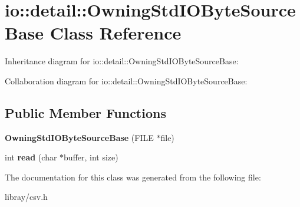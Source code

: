\hypertarget{classio_1_1detail_1_1OwningStdIOByteSourceBase}{}\section{io\+:\+:detail\+:\+:Owning\+Std\+I\+O\+Byte\+Source\+Base Class Reference}
\label{classio_1_1detail_1_1OwningStdIOByteSourceBase}


Inheritance diagram for io\+:\+:detail\+:\+:Owning\+Std\+I\+O\+Byte\+Source\+Base\+:


Collaboration diagram for io\+:\+:detail\+:\+:Owning\+Std\+I\+O\+Byte\+Source\+Base\+:
\subsection*{Public Member Functions}
\begin{DoxyCompactItemize}
\item 
\mbox{\label{classio_1_1detail_1_1OwningStdIOByteSourceBase_a259f77d1a3c57720b54b88d9f8a3c018}} 
{\bfseries Owning\+Std\+I\+O\+Byte\+Source\+Base} (F\+I\+LE $\ast$file)
\item 
\mbox{\label{classio_1_1detail_1_1OwningStdIOByteSourceBase_a9269e7bfd07ebf2fa3518912fe7bebd0}} 
int {\bfseries read} (char $\ast$buffer, int size)
\end{DoxyCompactItemize}


The documentation for this class was generated from the following file\+:\begin{DoxyCompactItemize}
\item 
libray/csv.\+h\end{DoxyCompactItemize}
